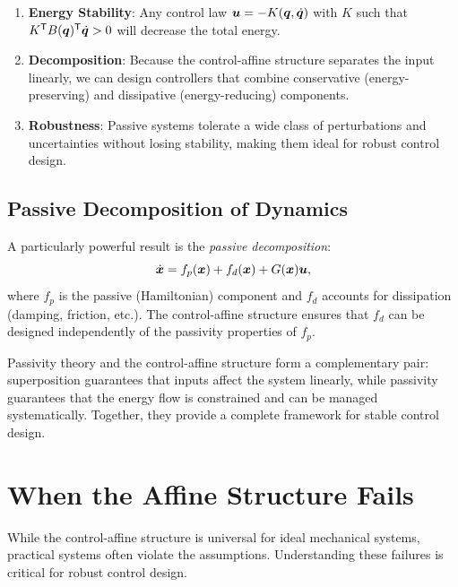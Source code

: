 \begin{enumerate}
\item \textbf{Energy Stability}: Any control law $\bm{u} = -K(\bm{q},\dot{\bm{q}})$ with
      $K$ such that $K^{\mathsf{T}} B(\bm{q})^{\mathsf{T}}\dot{\bm{q}} > 0$ will decrease the total energy.

\item \textbf{Decomposition}: Because the control-affine structure separates the input
      linearly, we can design controllers that combine conservative (energy-preserving) and
      dissipative (energy-reducing) components.

\item \textbf{Robustness}: Passive systems tolerate a wide class of perturbations and
      uncertainties without losing stability, making them ideal for robust control design.
\end{enumerate}

\subsection{Passive Decomposition of Dynamics}

A particularly powerful result is the \emph{passive decomposition}:
\begin{equation}
\dot{\bm{x}} = f_p(\bm{x}) + f_d(\bm{x}) + G(\bm{x})\bm{u},
\label{eq:ch3:passive-decomp}
\end{equation}
where $f_p$ is the passive (Hamiltonian) component and $f_d$ accounts for dissipation
(damping, friction, etc.). The control-affine structure ensures that $f_d$ can be designed
independently of the passivity properties of $f_p$.

\begin{designbox}
Passivity theory and the control-affine structure form a complementary pair: superposition
guarantees that inputs affect the system linearly, while passivity guarantees that the energy
flow is constrained and can be managed systematically. Together, they provide a complete
framework for stable control design.
\end{designbox}


\section{When the Affine Structure Fails}

While the control-affine structure is universal for ideal mechanical systems, practical systems
often violate the assumptions. Understanding these failures is critical for robust control design.

